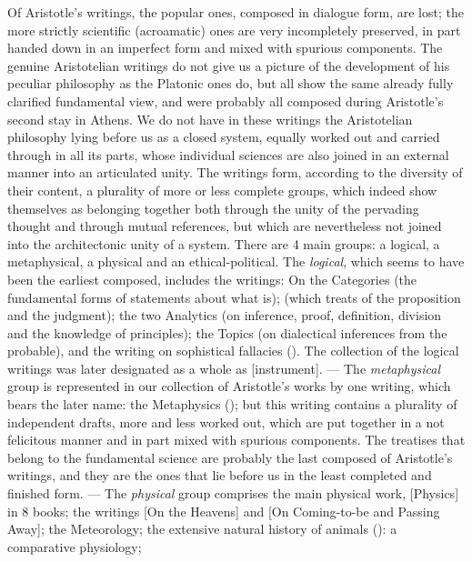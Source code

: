Of Aristotle's writings, the popular ones, composed in dialogue form,
are lost; the more strictly scientific (acroamatic) ones
are very incompletely preserved, in part handed down in an
imperfect form and mixed with spurious components. The
genuine Aristotelian writings do not give us a picture of the development of his peculiar philosophy as the Platonic ones do, but
all show the same already fully clarified fundamental view, and were
probably all composed during Aristotle's second stay
in Athens. We do not have in these writings the Aristotelian philosophy lying before us as a closed system, equally
worked out and carried through in all its parts, whose individual sciences are also joined in an external manner into an
articulated unity. The writings form, according to the diversity of their content, a plurality of more or less complete groups,
which indeed show themselves as belonging together both through the unity of the pervading thought and through mutual references, but
which are nevertheless not joined into the architectonic
unity of a system. There are 4 main groups: a logical, a metaphysical,
a physical and an ethical-political. The \emph{logical}, which seems to
have been the earliest composed, includes the writings: On the Categories (the fundamental forms of statements about what is); 
 (which treats of the proposition and the judgment); the two Analytics (on inference, proof, definition, division and the knowledge of principles); the Topics (on dialectical inferences
from the probable), and the writing on sophistical fallacies (). The collection of the logical
writings was later designated as a whole as  [instrument]. ---
The \emph{metaphysical} group is represented in our collection of
Aristotle's works by one writing, which bears the later
name: the Metaphysics (); but this writing
contains a plurality of independent drafts, more and less worked out,
which are put together in a not felicitous manner and
in part mixed with spurious components. The treatises that
belong to the fundamental science are probably the last
composed of Aristotle's writings, and they are the ones that lie before us in
the least completed and finished form. --- The \emph{physical}
group comprises the main physical work,  [Physics] in
8 books; the writings  [On the Heavens] and 
 [On Coming-to-be and Passing Away]; the Meteorology; the extensive natural history of animals
(): a comparative physiology;
